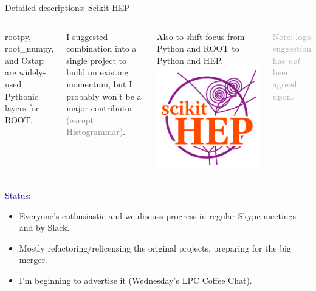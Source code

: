 \documentclass{beamer}
\begin{document}
\begin{frame}{Detailed descriptions: Scikit-HEP}
\vspace{0.5 cm}
\begin{columns}
rootpy, root\_numpy, and Ostap are widely-used Pythonic layers for ROOT.

\vspace{0.4 cm}
I suggested combination into a single project to build on existing momentum, but I probably won't be a major contributor \textcolor{gray}{(except Histogrammar)}.

\vspace{0.4 cm}
Also to shift focus from Python and ROOT to Python and HEP.
\scriptsize
\includegraphics[width=\linewidth]{femtocode-logo.png}

\textcolor{darkgray}{Note: logo suggestion has {\it not} been agreed upon.}
\end{columns}

\vspace{0.4 cm}
\textcolor{darkblue}{Status:}
\begin{itemize}
\item Everyone's enthusiastic and we discuss progress in regular Skype meetings and by Slack.
\item Mostly refactoring/relicensing the original projects, preparing for the big merger.
\item I'm beginning to advertise it (Wednesday's LPC Coffee Chat).
\end{itemize}
\end{frame}
\end{document}
